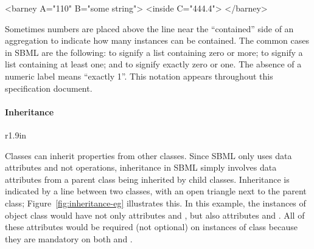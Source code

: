 \begin{blockChanged}
\begin{example}
<barney A="110" B="some string">
    <inside C="444.4">
</barney>
\end{example}

Sometimes numbers are placed above the line near the ``contained''
side of an aggregation to indicate how many instances can be
contained.  The common cases in SBML are the following:
\token{[0..*]} to signify a list containing zero or more;
\token{[1..*]} to signify a list containing at least one; and
\token{[0..1]} to signify exactly zero or one.  The absence of a
numeric label means ``exactly 1''.  This notation appears
throughout this specification document.


\paragraph{Inheritance}

\begin{wrapfigure}[18]{r}{1.9in}
  \centering
  \small
  \vspace*{-7ex}
  \caption{Inheritance.}
  \label{fig:inheritance-eg}
\end{wrapfigure}
Classes can inherit properties from other classes.  Since SBML
only uses data attributes and not operations, inheritance in SBML
simply involves data attributes from a parent class being
inherited by child classes.  Inheritance is indicated by a line
between two classes, with an open triangle next to the parent
class; Figure~\ref{fig:inheritance-eg} illustrates this.  In this
example, the instances of object class  would have
not only attributes  and , but also attributes
 and .  All of these attributes would be
required (not optional) on instances of class 
because they are mandatory on both  and
.




\end{blockChanged}
